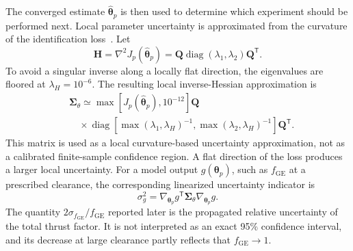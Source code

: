 \documentclass[journal]{IEEEtran}
\begin{document}
The converged estimate $\widehat{\boldsymbol{\theta}}_p$ is then used to determine which experiment should be performed next. Local parameter uncertainty is approximated from the curvature of the identification loss~\cite{Ljung1999}. Let
\begin{equation}
 \mathbf H=\nabla^2J_p(\widehat{\boldsymbol{\theta}}_p)
 =\mathbf Q\operatorname{diag}(\lambda_1,\lambda_2)\mathbf Q^{\mathsf T}.
\end{equation}
To avoid a singular inverse along a locally flat direction, the eigenvalues are floored at $\lambda_H=10^{-6}$. The resulting local inverse-Hessian approximation is
\begin{equation}
 \begin{split}
 &\boldsymbol{\Sigma}_{\theta}\simeq
 \max\!\left[J_p(\widehat{\boldsymbol{\theta}}_p),10^{-12}\right]\mathbf Q\\
 &\quad\times\operatorname{diag}\!\left[
 \max(\lambda_1,\lambda_H)^{-1},
 \max(\lambda_2,\lambda_H)^{-1}
 \right]\mathbf Q^{\mathsf T}.
 \end{split}
 \label{eq:parameter-covariance}
\end{equation}
This matrix is used as a local curvature-based uncertainty approximation, not as a calibrated finite-sample confidence region. A flat direction of the loss produces a larger local uncertainty. For a model output $g(\boldsymbol{\theta}_p)$, such as $f_{\mathrm{GE}}$ at a prescribed clearance, the corresponding linearized uncertainty indicator is
\begin{equation}
 \sigma_g^2=
 \nabla_{\boldsymbol{\theta}_p}g^{\mathsf T}
 \boldsymbol{\Sigma}_{\theta}
 \nabla_{\boldsymbol{\theta}_p}g.
 \label{eq:uncertainty-propagation}
\end{equation}
The quantity $2\sigma_{f_{\mathrm{GE}}}/f_{\mathrm{GE}}$ reported later is the propagated relative uncertainty of the total thrust factor. It is not interpreted as an exact 95\% confidence interval, and its decrease at large clearance partly reflects that $f_{\mathrm{GE}}\rightarrow1$.
\end{document}
